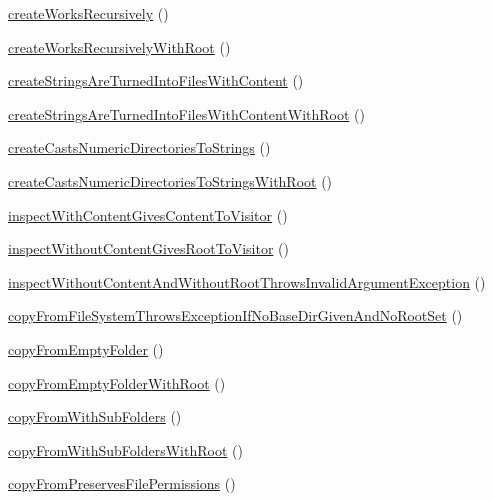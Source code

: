 \begin{DoxyCompactItemize}
\item 
\mbox{\hyperlink{classorg_1_1bovigo_1_1vfs_1_1vfs_stream_test_case_a3c3bb73015011fc8d08fba2c4855ad6a}{create\+Works\+Recursively}} ()
\item 
\mbox{\hyperlink{classorg_1_1bovigo_1_1vfs_1_1vfs_stream_test_case_a43925420ff90580a59dd296658571cfe}{create\+Works\+Recursively\+With\+Root}} ()
\item 
\mbox{\hyperlink{classorg_1_1bovigo_1_1vfs_1_1vfs_stream_test_case_ae02dd7485249f19a71284f9d961d8837}{create\+Strings\+Are\+Turned\+Into\+Files\+With\+Content}} ()
\item 
\mbox{\hyperlink{classorg_1_1bovigo_1_1vfs_1_1vfs_stream_test_case_a0f5189d2be01a77535ec18ed9b019e79}{create\+Strings\+Are\+Turned\+Into\+Files\+With\+Content\+With\+Root}} ()
\item 
\mbox{\hyperlink{classorg_1_1bovigo_1_1vfs_1_1vfs_stream_test_case_ae59071f7590a254e23ff1575acd3205f}{create\+Casts\+Numeric\+Directories\+To\+Strings}} ()
\item 
\mbox{\hyperlink{classorg_1_1bovigo_1_1vfs_1_1vfs_stream_test_case_a4d7e4112fd99211e6097543bc9ac88f2}{create\+Casts\+Numeric\+Directories\+To\+Strings\+With\+Root}} ()
\item 
\mbox{\hyperlink{classorg_1_1bovigo_1_1vfs_1_1vfs_stream_test_case_aa0e6738cb240ad39bc7d87d0e3af45fe}{inspect\+With\+Content\+Gives\+Content\+To\+Visitor}} ()
\item 
\mbox{\hyperlink{classorg_1_1bovigo_1_1vfs_1_1vfs_stream_test_case_a0261fdd60ca2dbaebadea50eac29aef7}{inspect\+Without\+Content\+Gives\+Root\+To\+Visitor}} ()
\item 
\mbox{\hyperlink{classorg_1_1bovigo_1_1vfs_1_1vfs_stream_test_case_a84c5443c028213c490dd3e433dae4c85}{inspect\+Without\+Content\+And\+Without\+Root\+Throws\+Invalid\+Argument\+Exception}} ()
\item 
\mbox{\hyperlink{classorg_1_1bovigo_1_1vfs_1_1vfs_stream_test_case_af85167cac6c37c4a9a5f7dc4e9aa2f26}{copy\+From\+File\+System\+Throws\+Exception\+If\+No\+Base\+Dir\+Given\+And\+No\+Root\+Set}} ()
\item 
\mbox{\hyperlink{classorg_1_1bovigo_1_1vfs_1_1vfs_stream_test_case_a7eb0c07395a782ae6c424612cd74863e}{copy\+From\+Empty\+Folder}} ()
\item 
\mbox{\hyperlink{classorg_1_1bovigo_1_1vfs_1_1vfs_stream_test_case_acf261fee5fc717ca718a1ec68f6c1a78}{copy\+From\+Empty\+Folder\+With\+Root}} ()
\item 
\mbox{\hyperlink{classorg_1_1bovigo_1_1vfs_1_1vfs_stream_test_case_af6c86490bf6ed921fe0d4c57bd4a76fa}{copy\+From\+With\+Sub\+Folders}} ()
\item 
\mbox{\hyperlink{classorg_1_1bovigo_1_1vfs_1_1vfs_stream_test_case_a36ad60211b195bf34ae08303cd362c68}{copy\+From\+With\+Sub\+Folders\+With\+Root}} ()
\item 
\mbox{\hyperlink{classorg_1_1bovigo_1_1vfs_1_1vfs_stream_test_case_a97a6991c10dd8ef990e58900206c95a9}{copy\+From\+Preserves\+File\+Permissions}} ()
\end{DoxyCompactItemize}
